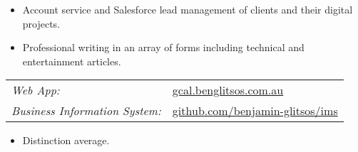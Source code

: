 \documentclass{resume}
\begin{document}
\begin{flushleft}

    \begin{itemize}
    \item Account service and Salesforce lead management of clients and their digital projects.
    \item Professional writing in an array of forms including technical and entertainment articles.
    \end{itemize}

\end{flushleft}

\vspace{-0.5em}


\begin{flushleft}
    \begin{tabularx}{\textwidth}{X X}
        \hfill\textit{Web App:} & \href{https://gcal.benglitsos.com.au/}{gcal.benglitsos.com.au} \\
        \hfill\textit{Business Information System:} & \href{https://github.com/benjamin-glitsos/inventory-management-system}{github.com/benjamin-glitsos/ims} \\
    \end{tabularx}
\end{flushleft}

\vspace{-0.5em}


\begin{flushleft}


    \begin{itemize}
    \item Distinction average.
    \end{itemize}

\end{flushleft}
\end{document}
